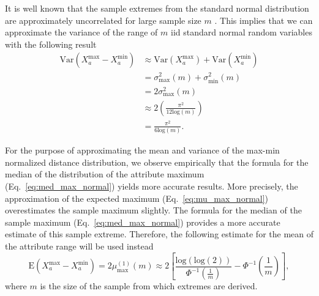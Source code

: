 \documentclass[10pt,letterpaper]{article}
\begin{document}
It is well known that the sample extremes from the standard normal distribution are approximately uncorrelated for large sample size $m$ \cite{gumbel1947}. This implies that we can approximate the variance of the range of $m$ iid standard normal random variables with the following result
%
\begin{equation}\label{eq:var_rng_normal}
\begin{aligned}
\text{Var}(X^\text{max}_a - X^\text{min}_a) &\approx \text{Var}(X^\text{max}_a) + \text{Var}(X^\text{min}_a) \\
&= \sigma^2_\text{max}(m) + \sigma^2_\text{min}(m) \\
&= 2\sigma^2_\text{max}(m) \\
&\approx 2\left(\frac{\pi^2}{12\text{log}(m)}\right) \\
&= \frac{\pi^2}{6\text{log}(m)}.
\end{aligned}
\end{equation}

For the purpose of approximating the mean and variance of the max-min normalized distance distribution, we observe empirically that the formula for the median of the distribution of the attribute maximum (Eq.~\ref{eq:med_max_normal}) yields more accurate results. More precisely, the approximation of the expected maximum (Eq.~\ref{eq:mu_max_normal}) overestimates the sample maximum slightly. The formula for the median of the sample maximum (Eq.~\ref{eq:med_max_normal}) provides a more accurate estimate of this sample extreme. Therefore, the following estimate for the mean of the attribute range will be used instead
%
\begin{equation}\label{eq:mu_rng_normal_improved}
\text{E}(X^\text{max}_a - X^\text{min}_a) = 2\mu^{(1)}_\text{max}(m) \approx 2\left[\frac{\text{log}(\text{log}(2))}{\Phi^{-1}\left(\frac{1}{m}\right)} - \Phi^{-1}\left(\frac{1}{m}\right)\right],
\end{equation}
%
where $m$ is the size of the sample from which extremes are derived.
\end{document}
